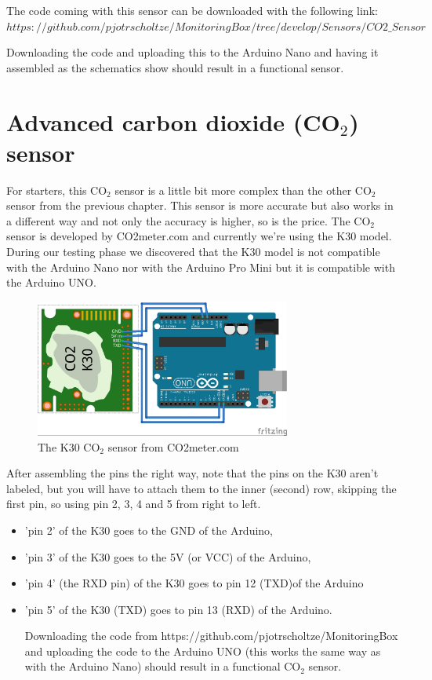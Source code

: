 \documentclass{report}
\begin{document}
The code coming with this sensor can be downloaded with the following link: $ https://github.com/pjotrscholtze/MonitoringBox/tree/develop/Sensors/CO2\_Sensor $


Downloading the code and uploading this to the Arduino Nano and having it assembled as the schematics show should result in a functional sensor. 

\chapter{Advanced carbon dioxide (CO$_2$) sensor}
For starters, this CO$_2$ sensor is a little bit more complex than the other CO$_2$ sensor from the previous chapter. This sensor is more accurate but also works in a different way and not only the accuracy is higher, so is the price. 
The CO$_2$ sensor is developed by CO2meter.com and currently we're using the K30 model. During our testing phase we discovered that the K30 model is not compatible with the Arduino Nano nor with the Arduino Pro Mini but it is compatible with the Arduino UNO. 

\begin{figure}[H]
	\centering
\includegraphics[width=0.75\textwidth]{images/K30-gas-sensor-schematic.jpg} 
	\caption{The K30 CO$_2$ sensor from  CO2meter.com}
\end{figure}

After assembling the pins the right way, note that the pins on the K30 aren't labeled, but you will have to attach them to the inner (second) row, skipping the first pin, so using pin 2, 3, 4 and 5 from right to left. 
\begin{itemize}
\item 'pin 2' of the K30 goes to the GND of the Arduino, 
\item 'pin 3' of the K30 goes to the 5V (or VCC) of the Arduino,
\item 'pin 4' (the RXD pin) of the K30 goes to pin 12 (TXD)of the Arduino 
\item 'pin 5' of the K30 (TXD) goes to pin 13 (RXD) of the Arduino. 

Downloading the code from https://github.com/pjotrscholtze/MonitoringBox and uploading the code to the Arduino UNO (this works the same way as with the Arduino Nano) should result in a functional CO$_2$ sensor. 
\end{itemize}
\end{document}
